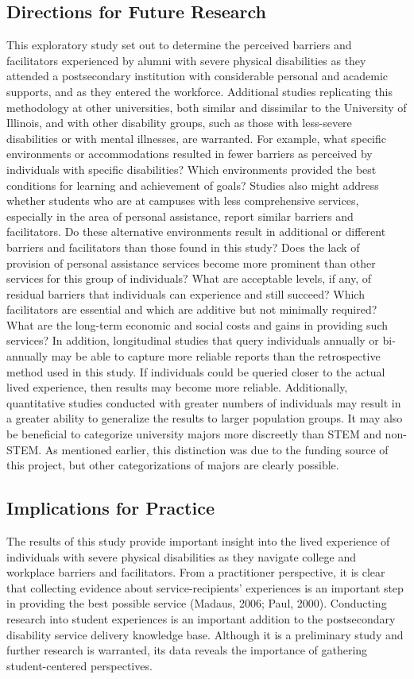 \documentclass[11.5pt]{sig-alternate} %
\begin{document}
\begin{large}
\subsection*{Directions for Future Research}
This exploratory study set out to determine the perceived barriers and facilitators experienced by alumni with severe physical disabilities as they attended a postsecondary institution with considerable personal and academic supports, and as they entered the workforce. Additional studies replicating this methodology at other universities, both similar and dissimilar to the University of Illinois, and with other disability groups, such as those with less-severe disabilities or with mental illnesses, are warranted. For example, what specific environments or accommodations resulted in fewer barriers as perceived by individuals with specific disabilities? Which environments provided the best conditions for learning and achievement of goals? Studies also might address whether students who are at campuses with less comprehensive services, especially in the area of personal assistance, report similar barriers and facilitators. Do these alternative environments result in additional or different barriers and facilitators than those found in this study? Does the lack of provision of personal assistance services become more prominent than other services for this group of individuals? What are acceptable levels, if any, of residual barriers that individuals can experience and still succeed? Which facilitators are essential and which are additive but not minimally required? What are the long-term economic and social costs and gains in providing such services? In addition, longitudinal studies that query individuals annually or bi-annually may be able to capture more reliable reports than the retrospective method used in this study. If individuals could be queried closer to the actual lived experience, then results may become more reliable. Additionally, quantitative studies conducted with greater numbers of individuals may result in a greater ability to generalize the results to larger population groups. It may also be beneficial to categorize university majors more discreetly than STEM and non-STEM. As mentioned earlier, this distinction was due to the funding source of this project, but other categorizations of majors are clearly possible.

\subsection*{Implications for Practice}
The results of this study provide important insight into the lived experience of individuals with severe physical disabilities as they navigate college and workplace barriers and facilitators. From a practitioner perspective, it is clear that collecting evidence about service-recipients' experiences is an important step in providing the best possible service (Madaus, 2006; Paul, 2000). Conducting research into student experiences is an important addition to the postsecondary disability service delivery knowledge base. Although it is a preliminary study and further research is warranted, its data reveals the importance of gathering student-centered perspectives.


\end{large}
\end{document}
